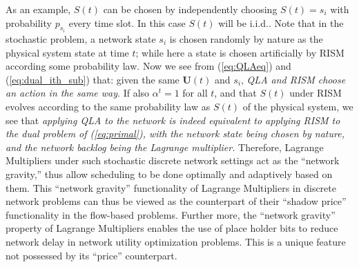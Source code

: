 \documentclass[journal]{IEEEtran}
\newcommand{\bv}[1]{{\boldsymbol{#1} }}
\begin{document}
As an example, $S(t)$ can be chosen by independently choosing $S(t)=s_i$ with probability $p_{s_i}$ every time slot. In this case $S(t)$ will be i.i.d..
Note that in the stochastic problem, a network state $s_i$ is chosen randomly by nature as the physical system state at time $t$; while here a state is chosen artificially by RISM according some probability law. Now we see from (\ref{eq:QLAeq}) and (\ref{eq:dual_ith_sub}) that: given the same $\bv{U}(t)$ and $s_i$, \emph{QLA and RISM choose an action in the same way}.  If also $\alpha^t=1$ for all $t$, and that $S(t)$ under RISM evolves according to the same probability law as $S(t)$ of the physical system, we see that \emph{applying QLA to the network is indeed equivalent to applying RISM to the dual problem of (\ref{eq:primal}), with the network state being chosen by nature, and the network backlog being the Lagrange multiplier.} Therefore,  Lagrange Multipliers under such stochastic discrete network settings act as the ``network gravity,'' thus allow scheduling to be done optimally and adaptively based on them. This ``network gravity'' functionality of Lagrange Multipliers in discrete network problems can thus be viewed as the counterpart of their ``shadow price'' functionality in the flow-based problems. Further more, the ``network gravity'' property of Lagrange Multipliers enables the use of place holder bits to reduce network delay in network utility optimization problems. This is a unique feature not possessed by its ``price'' counterpart.
\end{document}
